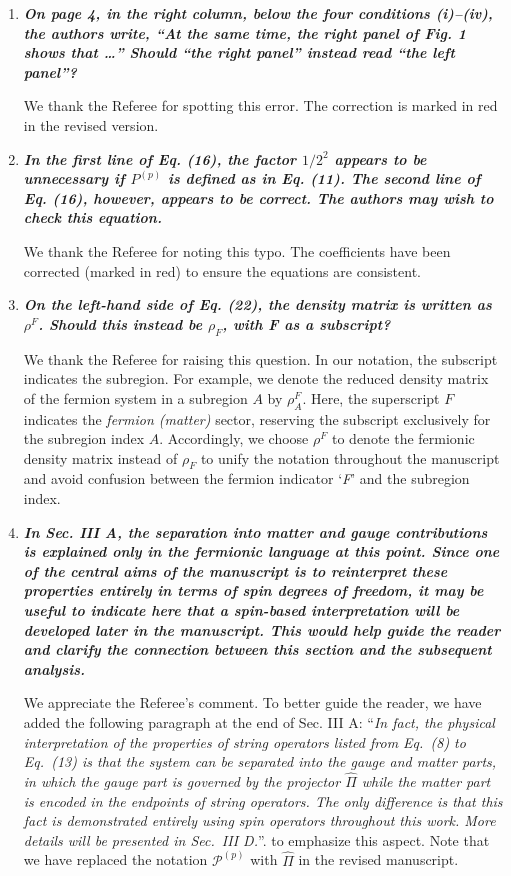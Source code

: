 \documentclass[12pt]{article}
\begin{document}
\begin{enumerate}
    \item \textbf{\textit{ On page 4, in the right column, below the four conditions (i)–(iv), the authors write, “At the same time, the right panel of Fig. 1 shows that …” Should “the right panel” instead read “the left panel”?}}

    We thank the Referee for spotting this error. The correction is marked in red in the revised version.

    \item \textbf{\textit{ In the first line of Eq. (16), the factor $1/2^2$ appears to be unnecessary if $P^{(p)}$ is defined as in Eq. (11). The second line of Eq. (16), however, appears to be correct. The authors may wish to check this equation.}}
    
    We thank the Referee for noting this typo. The coefficients have been corrected (marked in red) to ensure the equations are consistent.

    \item \textbf{\textit{On the left-hand side of Eq. (22), the density matrix is written as $\rho^F$. Should this instead be $\rho_F$, with F as a subscript?}}

    We thank the Referee for raising this question. In our notation, the subscript indicates the subregion. For example, we denote the reduced density matrix of the fermion system in a subregion $A$ by $\rho^F_A$. Here, the superscript $F$ indicates the \textit{fermion (matter)} sector, reserving the subscript exclusively for the subregion index $A$. Accordingly, we choose $\rho^F$ to denote the fermionic density matrix instead of $\rho_F$ to unify the notation throughout the manuscript and avoid confusion between the fermion indicator `\textit{F}' and the subregion index.

    \item \textbf{\textit{In Sec. III A, the separation into matter and gauge contributions is explained only in the fermionic language at this point. Since one of the central aims of the manuscript is to reinterpret these properties entirely in terms of spin degrees of freedom, it may be useful to indicate here that a spin-based interpretation will be developed later in the manuscript. This would help guide the reader and clarify the connection between this section and the subsequent analysis.}}

    We appreciate the Referee's comment. To better guide the reader, we have added the following paragraph at the end of Sec. III A: ``\textit{In fact, the physical interpretation of the properties of string operators listed from Eq.~(8) to Eq.~(13) is that the system can be separated into the gauge and matter parts, in which the gauge part is governed by the projector $\hat{\Pi}$ while the matter part is encoded in the endpoints of string operators. The only difference is that this fact is demonstrated entirely using spin operators throughout this work. More details will be presented in Sec.~III D.}''. to emphasize this aspect. Note that we have replaced the notation $\mathcal{P}^{(p)}$ with $\hat{\Pi}$ in the revised manuscript.
\end{enumerate}
\end{document}
